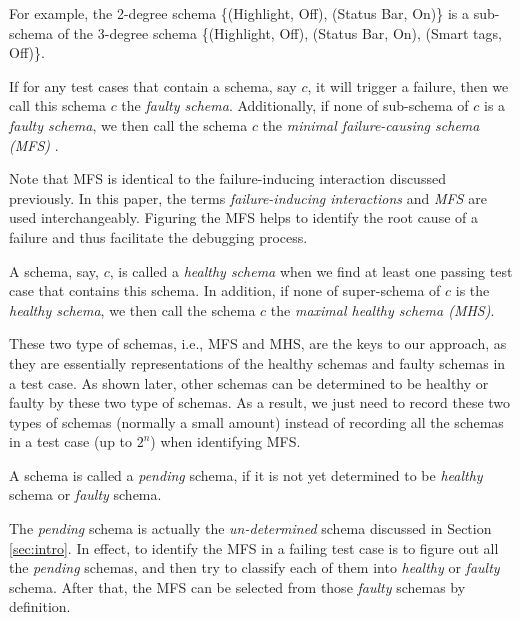 For example,  the 2-degree schema \{(Highlight, Off), (Status Bar, On)\} is a sub-schema of the 3-degree schema \{(Highlight, Off), (Status Bar, On), (Smart tags, Off)\}.

\begin{definition} \label{de:faulty:minimal}
If for any test cases that contain a schema, say $c$, it will trigger a failure, then we call this schema $c$ the \emph{faulty schema}. Additionally, if none of sub-schema of $c$ is a \emph{faulty schema}, we then call the schema $c$ the \emph{minimal failure-causing schema (MFS)} \cite{nie2011minimal}.

\end{definition}

Note that MFS is identical to the failure-inducing interaction discussed previously. In this paper, the terms \emph{failure-inducing interactions} and \emph{MFS} are used interchangeably. Figuring the MFS helps to identify the root cause of a failure and thus facilitate the debugging process.


\begin{definition}\label{de:healthy:maximal}
A schema, say, $c$, is called a \emph{healthy schema} when we find at least one passing test case that contains this schema. In addition, if none of super-schema of $c$ is the \emph{healthy schema}, we then call the schema $c$ the \emph{maximal healthy schema (MHS)}.
\end{definition}

These two type of schemas, i.e., MFS and MHS, are the keys to our approach, as they are essentially representations of the healthy schemas and faulty schemas in a test case. As shown later, other schemas can be determined to be healthy or faulty by these two type of schemas. As a result, we just need to record these two types of schemas (normally a small amount) instead of recording all the schemas in a test case (up to $2^{n}$) when identifying MFS.


\begin{definition}\label{de:pending}
A schema is called a \emph{pending} schema, if it is not yet determined to be \emph{healthy} schema or \emph{faulty} schema.
\end{definition}

The \emph{pending} schema is actually the \emph{un-determined} schema discussed in Section \ref{sec:intro}. In effect, to identify the MFS in a failing test case is to figure out all the \emph{pending} schemas, and then try to classify each of them into \emph{healthy} or \emph{faulty} schema. After that, the MFS can be selected from those \emph{faulty} schemas by definition.

